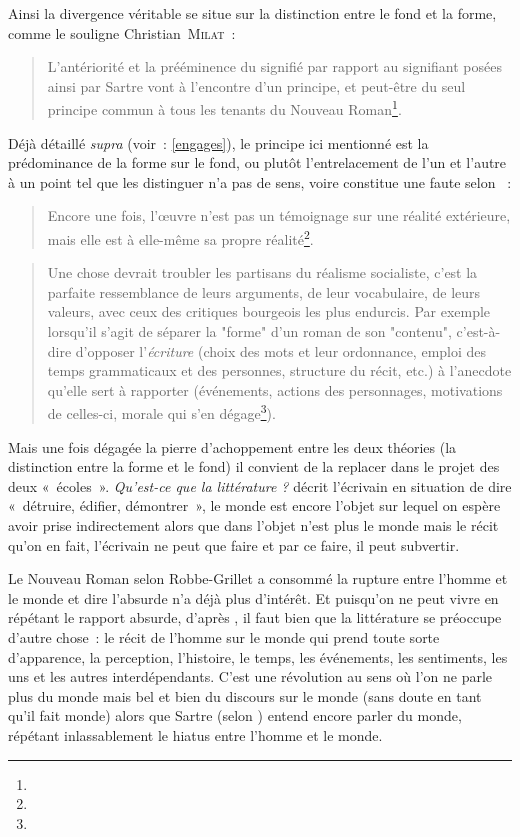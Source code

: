 Ainsi la divergence véritable se situe sur la distinction entre le fond et la forme, comme le souligne Christian~\textsc{Milat}~:
\begin{quote}
    L'antériorité et la prééminence du signifié par rapport au signifiant posées ainsi par Sartre vont à l'encontre d'un principe, et peut-être du seul principe commun à tous les tenants du Nouveau Roman\footnote{}.
\end{quote}
Déjà détaillé \textit{supra} (voir~: \ref{engages}), le principe ici mentionné est la prédominance de la forme sur le fond, ou plutôt l'entrelacement de l'un et l'autre à un point tel que les distinguer n'a pas de sens, voire constitue une faute selon \robbe~:
\begin{quote}
    Encore une fois, l'œuvre n'est pas un témoignage sur une réalité extérieure, mais elle est à elle-même sa propre réalité\footnote{}.
\end{quote}
\begin{quote}
    Une chose devrait troubler les partisans du réalisme socialiste, c'est la parfaite ressemblance de leurs arguments, de leur vocabulaire, de leurs valeurs, avec ceux des critiques bourgeois les plus endurcis. Par exemple lorsqu'il s'agit de séparer la "forme" d'un roman de son "contenu", c'est-à-dire d'opposer l'\textit{écriture} (choix des mots et leur ordonnance, emploi des temps grammaticaux et des personnes, structure du récit, etc.) à l'anecdote qu'elle sert à rapporter (événements, actions des personnages, motivations de celles-ci, morale qui s'en dégage\footnote{}).
\end{quote}


Mais une fois dégagée la pierre d'achoppement entre les deux théories (la distinction entre la forme et le fond) il convient de la replacer dans le projet des deux «~écoles~». \textit{Qu'est-ce que la littérature ?} décrit l'écrivain en situation de dire «~détruire, édifier, démontrer~», le monde est encore l'objet sur lequel on espère avoir prise indirectement alors que dans \punr{} l'objet n'est plus le monde mais le récit qu'on en fait, l'écrivain ne peut que faire et par ce faire, il peut subvertir. 

Le Nouveau Roman selon Robbe-Grillet a consommé la rupture entre l'homme et le monde et dire l'absurde n'a déjà plus d'intérêt. Et puisqu'on ne peut vivre en répétant le rapport absurde, d'après \robbe{}, il faut bien que la littérature se préoccupe d'autre chose~: le récit de l'homme sur le monde qui prend toute sorte d'apparence, la perception, l'histoire, le temps, les événements, les sentiments, les uns et les autres interdépendants. C'est une révolution au sens où l'on ne parle plus du monde mais bel et bien du discours sur le monde (sans doute en tant qu'il fait monde) alors que Sartre (selon \punr) entend encore parler du monde, répétant inlassablement le hiatus entre l'homme et le monde.

